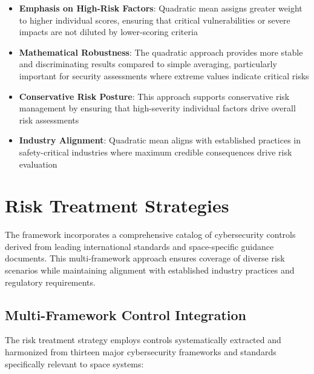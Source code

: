 \documentclass[binding=0.6cm]{sapthesis}
\begin{document}
\begin{itemize}
    \item \textbf{Emphasis on High-Risk Factors}: Quadratic mean assigns greater weight to higher individual scores, ensuring that critical vulnerabilities or severe impacts are not diluted by lower-scoring criteria
    \item \textbf{Mathematical Robustness}: The quadratic approach provides more stable and discriminating results compared to simple averaging, particularly important for security assessments where extreme values indicate critical risks
    \item \textbf{Conservative Risk Posture}: This approach supports conservative risk management by ensuring that high-severity individual factors drive overall risk assessments
    \item \textbf{Industry Alignment}: Quadratic mean aligns with established practices in safety-critical industries where maximum credible consequences drive risk evaluation
\end{itemize}


\section{Risk Treatment Strategies}
The framework incorporates a comprehensive catalog of cybersecurity controls derived from leading international standards and space-specific guidance documents. This multi-framework approach ensures coverage of diverse risk scenarios while maintaining alignment with established industry practices and regulatory requirements.

\subsection{Multi-Framework Control Integration}

The risk treatment strategy employs controls systematically extracted and harmonized from thirteen major cybersecurity frameworks and standards specifically relevant to space systems:
\end{document}
